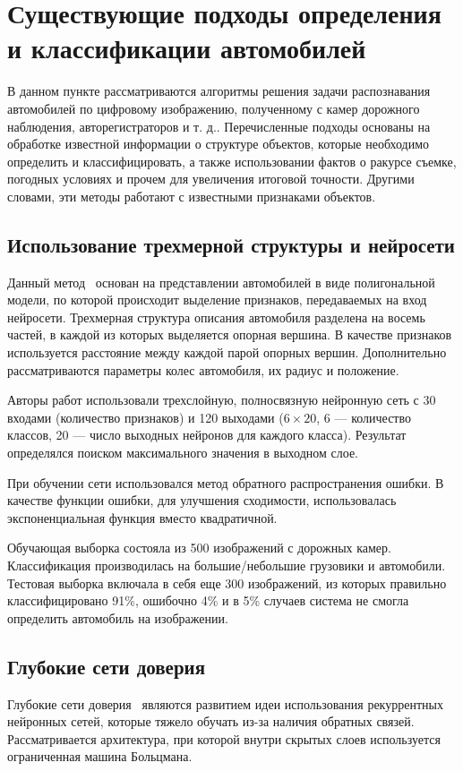 \documentclass[a4paper,14pt]{extarticle} %
\begin{document}
\section{Существующие подходы определения и классификации автомобилей}
\hspace{\parindent} В данном пункте рассматриваются алгоритмы решения задачи распознавания автомобилей по цифровому изображению, полученному с камер дорожного наблюдения, авторегистраторов и т. д.. Перечисленные подходы основаны на обработке известной информации о структуре объектов, которые необходимо определить и классифицировать, а также использовании фактов о ракурсе съемке, погодных условиях и прочем для увеличения итоговой точности. Другими словами, эти методы работают с известными признаками объектов.

\subsection{Использование трехмерной структуры и нейросети}
\hspace{\parindent} Данный метод~\cite{wu2001method} основан на представлении автомобилей в виде полигональной модели, по которой происходит выделение признаков, передаваемых на вход нейросети. Трехмерная структура описания автомобиля разделена на восемь частей, в каждой из которых выделяется опорная вершина. В качестве признаков используется расстояние между каждой парой опорных вершин. Дополнительно рассматриваются параметры колес автомобиля, их радиус и положение.

Авторы работ использовали трехслойную, полносвязную нейронную сеть с 30 входами (количество признаков) и 120 выходами ($6 \times 20$, 6 --- количество классов, 20 --- число выходных нейронов для каждого класса). Результат определялся поиском максимального значения в выходном слое. 

При обучении сети использовался метод обратного распространения ошибки. В качестве функции ошибки, для улучшения сходимости, использовалась экспоненциальная функция вместо квадратичной. 

Обучающая выборка состояла из 500 изображений с дорожных камер. Классификация производилась на большие/небольшие грузовики и автомобили. Тестовая выборка включала в себя еще 300 изображений, из которых правильно классифицировано 91\%, ошибочно 4\% и в 5\% случаев система не смогла определить автомобиль на изображении.

\subsection{Глубокие сети доверия} 
\hspace{\parindent} Глубокие сети доверия~\cite{wang2014vehicle} являются развитием идеи использования рекуррентных нейронных сетей, которые тяжело обучать из-за наличия обратных связей. Рассматривается архитектура, при которой внутри скрытых слоев используется ограниченная машина Больцмана. 
\end{document}
